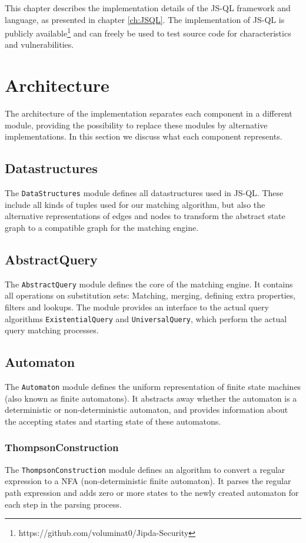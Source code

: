 This chapter describes the implementation details of the JS-QL framework and language, as presented in chapter \ref{ch:JSQL}. The implementation of JS-QL is publicly available\footnote{https://github.com/voluminat0/Jipda-Security} and can freely be used to test source code for characteristics and vulnerabilities.


\section{Architecture}
The architecture of the implementation separates each component in a different module, providing the possibility to replace these modules by alternative implementations. In this section we discuss what each component represents.

\subsection*{Datastructures}
The \texttt{DataStructures} module defines all datastructures used in JS-QL. These include all kinds of tuples used for our matching algorithm, but also the alternative representations of edges and nodes to transform the abstract state graph to a compatible graph for the matching engine.

\subsection*{AbstractQuery}
The \texttt{AbstractQuery} module defines the core of the matching engine. It contains all operations on substitution sets: Matching, merging, defining extra properties, filters and lookups. The module provides an interface to the actual query algorithms \texttt{ExistentialQuery} and \texttt{UniversalQuery}, which perform the actual query matching processes.

\subsection*{Automaton}
The \texttt{Automaton} module defines the uniform representation of finite state machines (also known as finite automatons). It abstracts away whether the automaton is a deterministic or non-deterministic automaton, and provides information about the accepting states and starting state of these automatons.

\subsubsection*{ThompsonConstruction}
The \texttt{ThompsonConstruction} module defines an algorithm to convert a regular expression to a NFA (non-deterministic finite automaton). It parses the regular path expression and adds zero or more states to the newly created automaton for each step in the parsing process.
